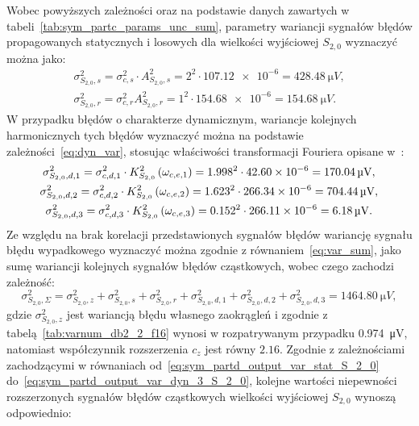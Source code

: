Wobec powyższych zależności oraz na podstawie danych zawartych w tabeli~\ref{tab:sym_partc_params_unc_sum}, parametry wariancji sygnałów błędów propagowanych statycznych i losowych dla wielkości wyjściowej $S_{2,0}$ wyznaczyć można jako:
\begin{gather}
\sigma_{S_{2,0},s}^{2} = \sigma_{c,s}^{2} \cdot A_{S_{2,0},s}^{2} = 2^{2} \cdot \num{107.12e-6} = \qty{428.48}{\micro V} \label{eq:sym_partd_output_var_stat_S_2_0}, \\
\sigma_{S_{2,0},r}^{2} = \sigma_{c,r}^{2} A_{S_{2,0},r}^{2} = 1^{2} \cdot \num{154.68e-6} = \qty{154.68}{\micro V} \label{eq:sym_partd_output_var_rand_S_2_0}.
\end{gather}
W przypadku błędów o charakterze dynamicznym, wariancje kolejnych harmonicznych tych błędów wyznaczyć można na podstawie zależności~\eqref{eq:dyn_var}, stosując właściwości transformacji Fouriera opisane w~\cite{oppenheim_sns}:
\begin{gather}
\sigma_{S_{2,0},d,1}^{2} = \sigma_{c,d,1}^{2} \cdot K_{S_{2,0}}^{2} \left(\omega_{c,e,1}\right) = {1.998}^{2} \cdot \num{42.60e-6} = \qty{170.04}{\micro V} \label{eq:sym_partd_output_var_dyn_1_S_2_0}, \\
\sigma_{S_{2,0},d,2}^{2} = \sigma_{c,d,2}^{2} \cdot K_{S_{2,0}}^{2} \left(\omega_{c,e,2}\right) = {1.623}^{2} \cdot \num{266.34e-6} = \qty{704.44}{\micro V} \label{eq:sym_partd_output_var_dyn_2_S_2_0}, \\
\sigma_{S_{2,0},d,3}^{2} = \sigma_{c,d,3}^{2} \cdot K_{S_{2,0}}^{2} \left(\omega_{c,e,3}\right) = {0.152}^{2} \cdot \num{266.11e-6} = \qty{6.18}{\micro V} \label{eq:sym_partd_output_var_dyn_3_S_2_0}.
\end{gather}
Ze względu na brak korelacji przedstawionych sygnałów błędów wariancję sygnału błędu wypadkowego wyznaczyć można zgodnie z równaniem~\eqref{eq:var_sum}, jako sumę wariancji kolejnych sygnałów błędów cząstkowych, wobec czego zachodzi zależność:
\begin{equation}
\sigma_{S_{2,0},\Sigma}^{2} = \sigma_{S_{2,0},z}^{2} + \sigma_{S_{2,0},s}^{2} + \sigma_{S_{2,0},r}^{2} + \sigma_{S_{2,0},d,1}^{2} + \sigma_{S_{2,0},d,2}^{2} + \sigma_{S_{2,0},d,3}^{2} = \qty{1464.80}{\micro V} \label{eq:sym_partd_output_var_sum_S_2_0},
\end{equation}
gdzie $\sigma_{S_{2,0},z}^{2}$ jest wariancją błędu własnego zaokrągleń i zgodnie z tabelą~\ref{tab:varnum_db2_2_f16} wynosi w rozpatrywanym przypadku \qty{0.974}{\micro V}, natomiast współczynnik rozszerzenia $c_{z}$ jest równy $2.16$.
Zgodnie z zależnościami zachodzącymi w równaniach od~\eqref{eq:sym_partd_output_var_stat_S_2_0} do~\eqref{eq:sym_partd_output_var_dyn_3_S_2_0}, kolejne wartości niepewności rozszerzonych sygnałów błędów cząstkowych wielkości wyjściowej $S_{2,0}$ wynoszą odpowiednio:
